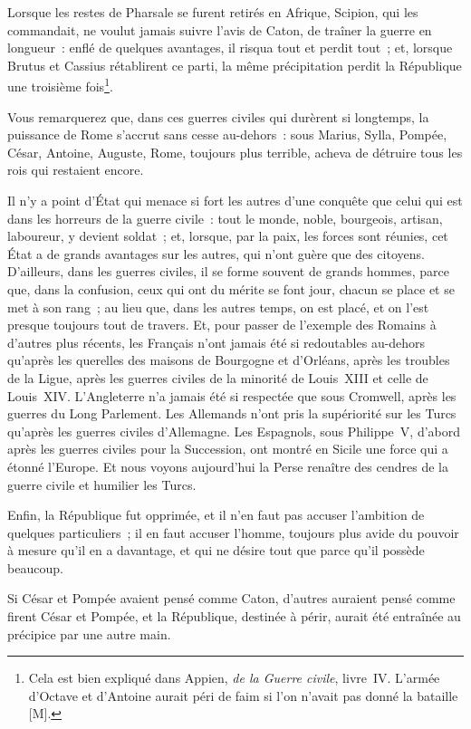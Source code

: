 \documentclass[french,twoside]{book} %
\begin{document}
Lorsque les restes de Pharsale se furent retirés en Afrique, Scipion, qui les commandait, ne voulut jamais suivre l’avis de Caton, de traîner la guerre en longueur : enflé de quelques avantages, il risqua tout et perdit tout ; et, lorsque Brutus et Cassius rétablirent ce parti, la même précipitation perdit la République une troisième fois\footnote{Cela est bien expliqué dans Appien, {\itshape de la Guerre civile}, livre IV. L’armée d’Octave et d’Antoine aurait péri de faim si l’on n’avait pas donné la bataille [M].}.\par
Vous remarquerez que, dans ces guerres civiles qui durèrent si longtemps, la puissance de Rome s’accrut sans cesse au-dehors : sous Marius, Sylla, Pompée, César, Antoine, Auguste, Rome, toujours plus terrible, acheva de détruire tous les rois qui restaient encore.\par
Il n’y a point d’État qui menace si fort les autres d’une conquête que celui qui est dans les horreurs de la guerre civile : tout le monde, noble, bourgeois, artisan, laboureur, y devient soldat ; et, lorsque, par la paix, les forces sont réunies, cet État a de grands avantages sur les autres, qui n’ont guère que des citoyens. D’ailleurs, dans les guerres civiles, il se forme souvent de grands hommes, parce que, dans la confusion, ceux qui ont du mérite se font jour, chacun se place et se met à son rang ; au lieu que, dans les autres temps, on est placé, et on l’est presque toujours tout de travers. Et, pour passer de l’exemple des Romains à d’autres plus récents, les Français n’ont jamais été si redoutables au-dehors qu’après les querelles des maisons de Bourgogne et d’Orléans, après les troubles de la Ligue, après les guerres civiles de la minorité de Louis XIII et celle de Louis XIV. L’Angleterre n’a jamais été si respectée que sous Cromwell, après les guerres du Long Parlement. Les Allemands n’ont pris la supériorité sur les Turcs qu’après les guerres civiles d’Allemagne. Les Espagnols, sous Philippe V, d’abord après les guerres civiles pour la Succession, ont montré en Sicile une force qui a étonné l’Europe. Et nous voyons aujourd’hui la Perse renaître des cendres de la guerre civile et humilier les Turcs.\par
Enfin, la République fut opprimée, et il n’en faut pas accuser l’ambition de quelques particuliers ; il en faut accuser l’homme, toujours plus avide du pouvoir à mesure qu’il en a davantage, et qui ne désire tout que parce qu’il possède beaucoup.\par
Si César et Pompée avaient pensé comme Caton, d’autres auraient pensé comme firent César et Pompée, et la République, destinée à périr, aurait été entraînée au précipice par une autre main.\par
\end{document}
